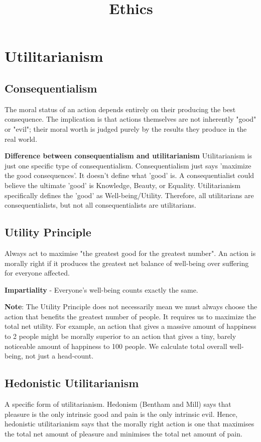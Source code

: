 \documentclass[12pt]{article}
\title{Ethics}
\date{}
\author{}
\begin{document}
\section{Utilitarianism}
\subsection{Consequentialism}
The moral status of an action depends entirely on their producing the best consequence.
The implication is that actions themselves are not inherently "good" or "evil"; their moral worth is judged purely by the results they produce in the real world.

\vspace{1em}
\noindent\textbf{Difference between consequentialism and utilitarianism}
Utilitarianism is just one specific type of consequentialism.
Consequentialism just says 'maximize the good consequences'.
It doesn't define what 'good' is.
A consequentialist could believe the ultimate 'good' is Knowledge, Beauty, or Equality.
Utilitarianism specifically defines the 'good' as Well-being/Utility.
Therefore, all utilitarians are consequentialists, but not all consequentialists are utilitarians.

\subsection{Utility Principle}
Always act to maximise "the greatest good for the greatest number".
An action is morally right if it produces the greatest net balance of well-being over suffering for everyone affected.

\noindent \textbf{Impartiality} - Everyone's well-being counts exactly the same.

\vspace{1em}
\textbf{Note}: The Utility Principle does not necessarily mean we must always choose the action that benefits the greatest number of people.
It requires us to maximize the total net utility.
For example, an action that gives a massive amount of happiness to 2 people might be morally superior to an action that gives a tiny, barely noticeable amount of happiness to 100 people.
We calculate total overall well-being, not just a head-count.

\subsection{Hedonistic Utilitarianism}
A specific form of utilitarianism. Hedonism (Bentham and Mill) says that pleasure is the only intrinsic good and pain is the only intrinsic evil.
Hence, hedonistic utilitarianism says that the morally right action is one that maximises the total net amount of pleasure and minimises the total net amount of pain.
\end{document}
